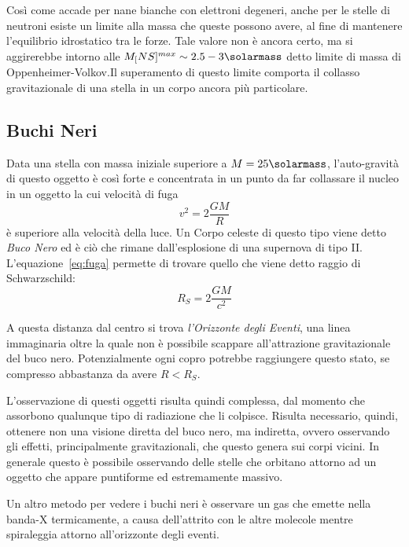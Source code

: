 Così come accade per nane bianche con elettroni degeneri, anche per le stelle di neutroni esiste un limite alla massa che queste possono avere, al fine di mantenere l'equilibrio idrostatico tra le forze. Tale valore non è ancora certo, ma si aggirerebbe intorno alle $M_[NS]^{max} \sim 2.5 - 3 \si{\solarmass}$ detto limite di massa di Oppenheimer-Volkov.Il superamento di questo limite comporta il collasso gravitazionale di una stella in un corpo ancora più particolare.\subsection{Buchi Neri}\label{black-holes}

Data una stella con massa iniziale superiore a $M = 25\si{\solarmass}$, l'auto-gravità di questo oggetto è così forte e concentrata in un punto da far collassare il nucleo in un oggetto la cui velocità di fuga
\begin{equation}\label{eq:fuga}
    v^2 = 2 \frac{GM}{R}
\end{equation}
è superiore alla velocità della luce. Un Corpo celeste di questo tipo viene detto \textit{Buco Nero} ed è ciò che rimane dall'esplosione di una supernova di tipo II. L'equazione~\ref{eq:fuga} permette di trovare quello che viene detto raggio di Schwarzschild:
\begin{equation}\label{eq:schwarzschild}
    R_S = 2 \frac{GM}{c^2}
\end{equation}

A questa distanza dal centro si trova \textit{l'Orizzonte degli Eventi}, una linea immaginaria oltre la quale non è possibile scappare all'attrazione gravitazionale del buco nero. Potenzialmente ogni copro potrebbe raggiungere questo stato, se compresso abbastanza da avere $R<R_S$.

L'osservazione di questi oggetti risulta quindi complessa, dal momento che assorbono qualunque tipo di radiazione che li colpisce. Risulta necessario, quindi, ottenere non una visione diretta del buco nero, ma indiretta, ovvero osservando gli effetti, principalmente gravitazionali, che questo genera sui corpi vicini. In generale questo è possibile osservando delle stelle che orbitano attorno ad un oggetto che appare puntiforme ed estremamente massivo.

Un altro metodo per vedere i buchi neri è osservare un gas che emette nella banda-X termicamente, a causa dell'attrito con le altre molecole mentre spiraleggia attorno all'orizzonte degli eventi.

